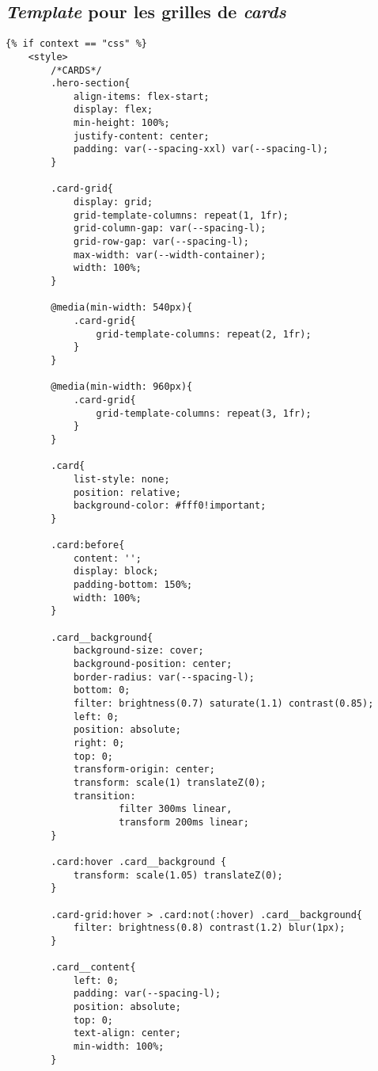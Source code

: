 \documentclass{article}
\begin{document}
\subsection{\textit{Template} pour les grilles de \textit{cards}}
\begin{verbatim}
{% if context == "css" %}
    <style>
        /*CARDS*/
        .hero-section{
            align-items: flex-start;
            display: flex;
            min-height: 100%;
            justify-content: center;
            padding: var(--spacing-xxl) var(--spacing-l);
        }

        .card-grid{
            display: grid;
            grid-template-columns: repeat(1, 1fr);
            grid-column-gap: var(--spacing-l);
            grid-row-gap: var(--spacing-l);
            max-width: var(--width-container);
            width: 100%;
        }

        @media(min-width: 540px){
            .card-grid{
                grid-template-columns: repeat(2, 1fr);
            }
        }

        @media(min-width: 960px){
            .card-grid{
                grid-template-columns: repeat(3, 1fr);
            }
        }

        .card{
            list-style: none;
            position: relative;
            background-color: #fff0!important;
        }

        .card:before{
            content: '';
            display: block;
            padding-bottom: 150%;
            width: 100%;
        }

        .card__background{
            background-size: cover;
            background-position: center;
            border-radius: var(--spacing-l);
            bottom: 0;
            filter: brightness(0.7) saturate(1.1) contrast(0.85);
            left: 0;
            position: absolute;
            right: 0;
            top: 0;
            transform-origin: center;
            transform: scale(1) translateZ(0);
            transition:
                    filter 300ms linear,
                    transform 200ms linear;
        }

        .card:hover .card__background {
            transform: scale(1.05) translateZ(0);
        }

        .card-grid:hover > .card:not(:hover) .card__background{
            filter: brightness(0.8) contrast(1.2) blur(1px);
        }

        .card__content{
            left: 0;
            padding: var(--spacing-l);
            position: absolute;
            top: 0;
            text-align: center;
            min-width: 100%;
        }


\end{verbatim}
\end{document}
